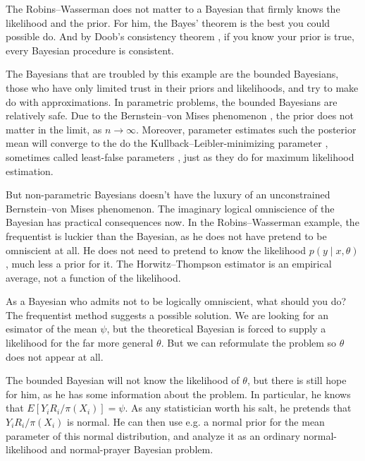 The Robins--Wasserman does not matter to a Bayesian that firmly knows the likelihood and the prior. For him, the Bayes' theorem is the best you could possible do. And by Doob's consistency theorem \parencite{Miller2018-xq}, if you know your prior is true, every Bayesian procedure is consistent.

The Bayesians that are troubled by this example are the bounded Bayesians, those who have only limited trust in their
priors and likelihoods, and try to make do with approximations. In
parametric problems, the bounded Bayesians are relatively safe. Due
to the Bernstein--von Mises phenomenon \parencite[Section 10.2]{Van_der_Vaart2000-qc},
the prior does not matter in the limit, as $n\to\infty$. Moreover,
parameter estimates such the posterior mean will converge to the do
the Kullback--Leibler-minimizing parameter \parencite[Theorem 2.1]{Bunke1998-vg},
sometimes called least-false parameters \parencite[p. 25]{Claeskens2008-hk},
just as they do for maximum likelihood estimation.

But non-parametric Bayesians doesn't have the luxury of an unconstrained
Bernstein--von Mises phenomenon. The imaginary logical omniscience
of the Bayesian has practical consequences now. In the Robins--Wasserman
example, the frequentist is luckier than the Bayesian, as he does
not have pretend to be omniscient at all. He does not need to pretend
to know the likelihood $p(y\mid x,\theta)$, much less a prior for
it. The Horwitz--Thompson estimator is an empirical average, not
a function of the likelihood.

As a Bayesian who admits not to be logically omniscient, what should
you do? The frequentist method suggests a possible solution. We are
looking for an esimator of the mean $\psi$, but the theoretical Bayesian
is forced to supply a likelihood for the far more general $\theta$.
But we can reformulate the problem so $\theta$ does not appear at
all. 
\begin{example}
 The bounded Bayesian will not know the likelihood of $\theta$,
but there is still hope for him, as he has some information about
the problem. In particular, he knows that $E[Y_{i}R_{i}/\pi(X_{i})]=\psi$.
As any statistician worth his salt, he pretends that $Y_{i}R_{i}/\pi(X_{i})$
is normal. He can then use e.g. a normal prior for the mean parameter
of this normal distribution, and analyze it as an ordinary normal-likelihood
and normal-prayer Bayesian problem.
\end{example}

